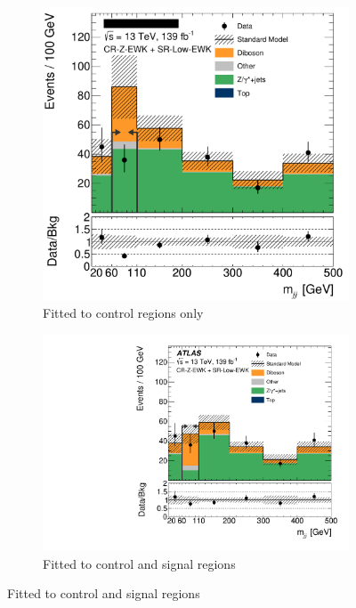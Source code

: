 \begin{figure}[tp]
\centering
\begin{subfigure}{0.48\textwidth}
\centering
\includegraphics[width=\textwidth]{figures/2ljets_aux_CR_Z_EWKSR_Low_EWK_mjj_no_sr.png}
\caption{Fitted to control regions only}
\end{subfigure}
\hfill
\begin{subfigure}{0.48\textwidth}
\centering
\includegraphics[width=\textwidth]{figures/2ljets_aux_CR_Z_EWKSR_Low_EWK_mjj.pdf}
\caption{Fitted to control and signal regions}

\end{subfigure}
\end{figure}
